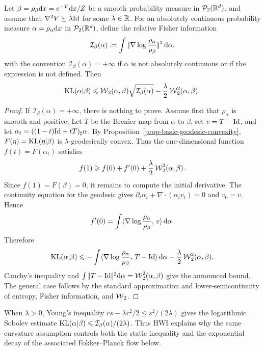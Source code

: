 \begin{prop}\label{prop-hwi-inequality}
	Let $\beta=\rho_\beta\mathrm{d} x=e^{-V}\mathrm{d} x/Z$ be a smooth probability measure in $\mathcal{P}_2(\mathbb{R}^d)$, and assume that $\nabla^2 V\succeq \lambda \mathrm{Id}$ for some $\lambda\in\mathbb{R}$. For an absolutely continuous probability measure $\alpha=\rho_\alpha\mathrm{d} x$ in $\mathcal{P}_2(\mathbb{R}^d)$, define the relative Fisher information
	\[
		\mathcal I_\beta(\alpha)
		\coloneqq
		\int |\!| \nabla\log\frac{\rho_\alpha}{\rho_\beta} |\!|^2\,\mathrm{d}\alpha,
	\]
	with the convention $\mathcal I_\beta(\alpha)=+\infty$ if $\alpha$ is not absolutely continuous or if the expression is not defined. Then
	\[
		\operatorname{KL}(\alpha|\beta)
		\leqslant
		\operatorname{\mathcal{W}}_2(\alpha,\beta)\sqrt{\mathcal I_\beta(\alpha)}
		-\frac{\lambda}{2}\operatorname{\mathcal{W}}_2^2(\alpha,\beta).
	\]
\end{prop}

\begin{proof}
	If $\mathcal I_\beta(\alpha)=+\infty$, there is nothing to prove. Assume first that $\rho_\alpha$ is smooth and positive. Let $T$ be the Brenier map from $\alpha$ to $\beta$, set $v=T-\mathrm{Id}$, and let $\alpha_t=((1-t)\mathrm{Id}+tT)_\sharp\alpha$. By Proposition~\ref{prop-basic-geodesic-convexity}, $F(\eta)=\operatorname{KL}(\eta|\beta)$ is $\lambda$-geodesically convex. Thus the one-dimensional function $f(t)=F(\alpha_t)$ satisfies
	\[
		f(1)\geqslant f(0)+f'(0)+\frac{\lambda}{2}\operatorname{\mathcal{W}}_2^2(\alpha,\beta).
	\]
	Since $f(1)=F(\beta)=0$, it remains to compute the initial derivative. The continuity equation for the geodesic gives $\partial_t\alpha_t+\nabla\cdot(\alpha_t v_t)=0$ and $v_0=v$. Hence
	\[
		f'(0)
		=
		\int \langle \nabla\log\frac{\rho_\alpha}{\rho_\beta},\,v\rangle\,\mathrm{d}\alpha.
	\]
	Therefore
	\[
		\operatorname{KL}(\alpha|\beta)
		\leqslant
		-\int \langle \nabla\log\frac{\rho_\alpha}{\rho_\beta},\,T-\mathrm{Id}\rangle\,\mathrm{d}\alpha
		-\frac{\lambda}{2}\operatorname{\mathcal{W}}_2^2(\alpha,\beta).
	\]
	Cauchy's inequality and $\int|\!| T-\mathrm{Id} |\!|^2\mathrm{d}\alpha=\operatorname{\mathcal{W}}_2^2(\alpha,\beta)$ give the announced bound. The general case follows by the standard approximation and lower-semicontinuity of entropy, Fisher information, and $\operatorname{\mathcal{W}}_2$.
\end{proof}

When $\lambda>0$, Young's inequality $rs-\lambda r^2/2\leq s^2/(2\lambda)$ gives the logarithmic Sobolev estimate $\operatorname{KL}(\alpha|\beta)\leqslant \mathcal I_\beta(\alpha)/(2\lambda)$. Thus HWI explains why the same curvature assumption controls both the static inequality and the exponential decay of the associated Fokker--Planck flow below.

